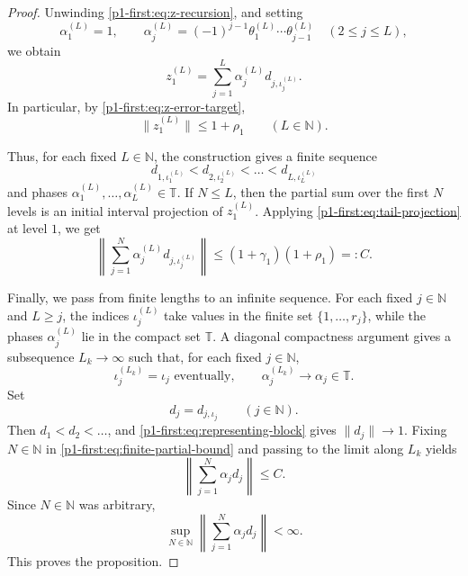 \documentclass[10pt,a4paper]{amsart}
\newcommand{\N}{\mathbb N}
\newcommand{\T}{\mathbb T}
\begin{document}
\begin{proof}
Unwinding \eqref{p1-first:eq:z-recursion}, and setting
\begin{equation*}
        \alpha_1^{(L)}=1, \qquad \alpha_j^{(L)}=(-1)^{j-1}\theta_1^{(L)}\cdots\theta_{j-1}^{(L)} \quad(2\leq j\leq L),
\end{equation*}
we obtain
\begin{equation}
\label{p1-first:eq:finite-expansion}
        z_1^{(L)}=\sum_{j=1}^{L}\alpha_j^{(L)}d_{j,\iota_j^{(L)}}.
\end{equation}
In particular, by \eqref{p1-first:eq:z-error-target},
\begin{equation}
\label{p1-first:eq:z1-bound}
        \|z_1^{(L)}\|\leq 1+\rho_1 \qquad(L\in\N).
\end{equation}

Thus, for each fixed $L\in\N$, the construction gives a finite sequence
\begin{equation*}
        d_{1,\iota_1^{(L)}}<d_{2,\iota_2^{(L)}}<\ldots<d_{L,\iota_L^{(L)}}
\end{equation*}
and phases $\alpha_1^{(L)},\ldots,\alpha_L^{(L)}\in\T$. If $N\leq L$, then the partial sum over the first $N$ levels is an initial interval projection of $z_1^{(L)}$. Applying \eqref{p1-first:eq:tail-projection} at level $1$, we get
\begin{equation}
\label{p1-first:eq:finite-partial-bound}
        \left\|\sum_{j=1}^{N}\alpha_j^{(L)}d_{j,\iota_j^{(L)}}\right\|\leq (1+\gamma_1)(1+\rho_1)=:C.
\end{equation}


Finally, we pass from finite lengths to an infinite sequence. For each fixed $j\in\N$ and $L \geq j$, the indices $\iota_j^{(L)}$ take values in the finite set $\{1,\ldots,r_j\}$, while the phases $\alpha_j^{(L)}$ lie in the compact set $\T$. A diagonal compactness argument gives a subsequence $L_k\to\infty$ such that, for each fixed $j\in\N$,
\begin{equation*}
        \iota_j^{(L_k)}=\iota_j \text{ eventually},
        \qquad
        \alpha_j^{(L_k)}\to\alpha_j\in\T.
\end{equation*}
Set
\begin{equation*}
        d_j=d_{j,\iota_j}\qquad(j\in\N).
\end{equation*}
Then $d_1<d_2<\ldots$, and \eqref{p1-first:eq:representing-block} gives $\|d_j\|\to1$. Fixing $N\in\N$ in \eqref{p1-first:eq:finite-partial-bound} and passing to the limit along $L_k$ yields
\begin{equation*}
        \left\|\sum_{j=1}^{N}\alpha_jd_j\right\|\leq C.
\end{equation*}
Since $N\in\N$ was arbitrary,
\begin{equation*}
        \sup_{N\in\N}\left\|\sum_{j=1}^{N}\alpha_jd_j\right\|<\infty.
\end{equation*}
This proves the proposition.
\end{proof}
\end{document}
